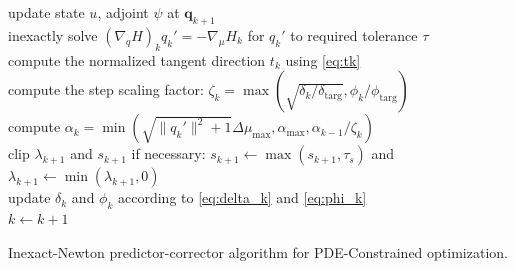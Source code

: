 \begin{algorithm}[tbh]
{  
  update state $u$, adjoint $\psi$ at $\boldsymbol{q}_{k+1}$ \\ 
  \ShowLn
   inexactly solve $\left(\nabla_q H\right)_{k} q_{k}' = - \nabla_\mu H_{k}$
  for $q_{k}'$ to required tolerance $\tau$   \label{line:tang} \\
  compute the normalized tangent direction $t_{k}$ using \eqref{eq:tk} \\
  compute the step scaling factor: $\zeta_{k} = \max\left( \sqrt{\delta_k/\delta_{\text{targ}}}, \phi_k / \phi_{\text{targ}} \right)$\\
  compute $\alpha_{k} = \min\left( \sqrt{\|q_{k}'\|^2 + 1}\Delta \mu_{\max}, \alpha_{\max}, \alpha_{k-1}/\zeta_{k} \right)$\\
  clip $\lambda_{k+1}$ and $s_{k+1}$ if necessary: $s_{k+1} \leftarrow \max(s_{k+1},\tau_s)$ and
  $\lambda_{k+1} \leftarrow \min(\lambda_{k+1},0)$ \\
  update $\delta_k$ and $\phi_{k}$ according to \eqref{eq:delta_k} and
  \eqref{eq:phi_k} \\
  $k \leftarrow k+1$
  }
\caption{Inexact-Newton predictor-corrector algorithm for PDE-Constrained
  optimization.\label{alg:pc}}
\end{algorithm}
